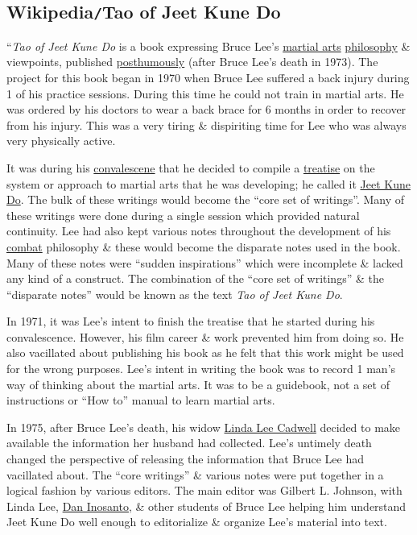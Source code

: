 \documentclass{article}
\begin{document}

\subsection{Wikipedia{\tt/}Tao of Jeet Kune Do}
``{\it Tao of Jeet Kune Do} is a book expressing {\sc Bruce Lee}'s \href{https://en.wikipedia.org/wiki/Martial_arts}{martial arts} \href{https://en.wikipedia.org/wiki/Philosophy}{philosophy} \& viewpoints, published \href{https://en.wikipedia.org/wiki/Posthumous_work}{posthumously} (after {\sc Bruce Lee}'s death in 1973). The project for this book began in 1970 when {\sc Bruce Lee} suffered a back injury during 1 of his practice sessions. During this time he could not train in martial arts. He was ordered by his doctors to wear a back brace for 6 months in order to recover from his injury. This was a very tiring \& dispiriting time for {\sc Lee} who was always very physically active.

It was during his \href{https://en.wikipedia.org/wiki/Convalescence}{convalescene} that he decided to compile a \href{https://en.wikipedia.org/wiki/Treatise}{treatise} on the system or approach to martial arts that he was developing; he called it \href{https://en.wikipedia.org/wiki/Jeet_Kune_Do}{Jeet Kune Do}. The bulk of these writings would become the ``core set of writings''. Many of these writings were done during a single session which provided natural continuity. {\sc Lee} had also kept various notes throughout the development of his \href{https://en.wikipedia.org/wiki/Combat}{combat} philosophy \& these would become the disparate notes used in the book. Many of these notes were ``sudden inspirations'' which were incomplete \& lacked any kind of a construct. The combination of the ``core set of writings'' \& the ``disparate notes'' would be known as the text {\it Tao of Jeet Kune Do}.

In 1971, it was {\sc Lee}'s intent to finish the treatise that he started during his convalescence. However, his film career \& work prevented him from doing so. He also vacillated about publishing his book as he felt that this work might be used for the wrong purposes. {\sc Lee}'s intent in writing the book was to record 1 man's way of thinking about the martial arts. It was to be a guidebook, not a set of instructions or ``How to'' manual to learn martial arts.

In 1975, after {\sc Bruce Lee}'s death, his widow \href{https://en.wikipedia.org/wiki/Linda_Lee_Cadwell}{Linda Lee Cadwell} decided to make available the information her husband had collected. {\sc Lee}'s untimely death changed the perspective of releasing the information that {\sc Bruce Lee} had vacillated about. The ``core writings'' \& various notes were put together in a logical fashion by various editors. The main editor was {\sc Gilbert L. Johnson}, with {\sc Linda Lee}, \href{https://en.wikipedia.org/wiki/Dan_Inosanto}{\sc Dan Inosanto}, \& other students of {\sc Bruce Lee} helping him understand Jeet Kune Do well enough to editorialize \& organize {\sc Lee}'s material into text.
\end{document}

